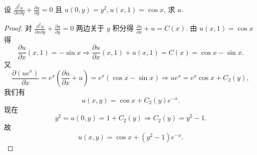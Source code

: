 \documentclass[../../main.tex]{subfiles}
\begin{document}
\begin{example}
设 \( \frac{\partial^2 u}{\partial x \partial y} + \frac{\partial u}{\partial y} = 0 \) 且 \( u(0, y) = y^2, u(x, 1) = \cos x \), 求 \( u \).
\end{example}
\begin{proof}
对 \( \frac{\partial^2 u}{\partial x \partial y} + \frac{\partial u}{\partial y} = 0 \) 两边关于 \( y \) 积分得 \( \frac{\partial u}{\partial x} + u = C(x) \). 由 \( u(x, 1) = \cos x \) 得
\[
\frac{\partial u}{\partial x}(x,1)=-\sin x\Rightarrow \frac{\partial u}{\partial x}\left( x,1 \right) +u\left( x,1 \right) =C(x)=\cos x-\sin x.
\]
又
\[
\frac{\partial (u e^x)}{\partial x} = e^x \left( \frac{\partial u}{\partial x} + u \right) = e^x (\cos x - \sin x) \Rightarrow u e^x = e^x \cos x + C_2(y),
\]
我们有
\[
u(x, y) = \cos x + C_2(y) e^{-x}.
\]
现在
\[
y^2 = u(0, y) = 1 + C_2(y) \Rightarrow C_2(y) = y^2 - 1.
\]
故
\[
u(x, y) = \cos x + (y^2 - 1) e^{-x}.
\]

\end{proof}
\end{document}
